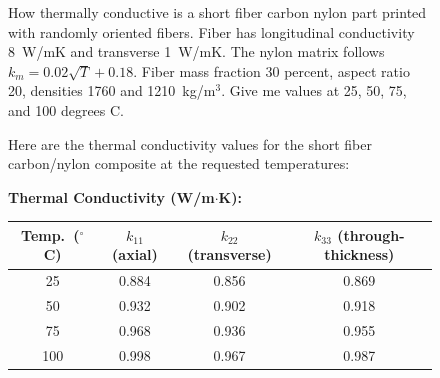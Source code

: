 \documentclass[preprint,review,10pt,number]{elsarticle}
\begin{document}
\begin{figure}[h]
\begin{tcolorbox}[
    colback=gray!5,
    colframe=black,
    boxrule=0.6pt,
    arc=2pt,
    left=8pt, right=8pt, top=6pt, bottom=6pt,
    title={\textbf{Prompt K3} \hfill \textit{Orientation keyword \& parametric conductivity model}},
    fonttitle=\small
]
\begin{tcolorbox}[
    colback=gray!8,
    colframe=gray!60,
    boxrule=0.5pt,
    arc=2pt,
    left=6pt, right=6pt, top=4pt, bottom=4pt,
    title={\textbf{User}},
    fonttitle=\small\bfseries,
    coltitle=black
]
\small
How thermally conductive is a short fiber carbon nylon part printed 
with randomly oriented fibers. Fiber has longitudinal conductivity 
8~W/mK and transverse 1~W/mK. The nylon matrix follows 
$k_m = 0.02\sqrt{T} + 0.18$. Fiber mass fraction 30 percent, aspect 
ratio 20, densities 1760 and 1210~kg/m$^3$. Give me values at 25, 
50, 75, and 100 degrees C.
\end{tcolorbox}
\vspace{6pt}
\begin{tcolorbox}[
    colback=gray!3,
    colframe=gray!40,
    boxrule=0.5pt,
    arc=2pt,
    left=6pt, right=6pt, top=4pt, bottom=4pt,
    title={\textbf{\texttt{MateriAl}}},
    fonttitle=\small\bfseries,
    coltitle=black
]
\small
Here are the thermal conductivity values for the short fiber 
carbon/nylon composite at the requested temperatures:
\vspace{4pt}

\textbf{Thermal Conductivity (W/m$\cdot$K):}
\begin{center}
\begin{tabular}{cccc}
\toprule
Temp.\ ($^\circ$C) & $k_{11}$ (axial) & $k_{22}$ (transverse) & $k_{33}$ (through-thickness) \\
\midrule
25  & 0.884 & 0.856 & 0.869 \\
50  & 0.932 & 0.902 & 0.918 \\
75  & 0.968 & 0.936 & 0.955 \\
100 & 0.998 & 0.967 & 0.987 \\
\bottomrule
\end{tabular}
\end{center}
\vspace{4pt}


\end{tcolorbox}
\end{tcolorbox}
\end{figure}
\end{document}
